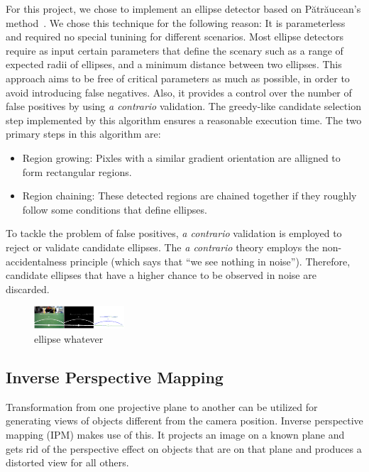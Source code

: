 \documentclass[	DIV=calc,%
							paper=a4,%
							fontsize=9pt,%
							twocolumn]{scrartcl}	 					%
\begin{document}
For this project, we chose to implement an ellipse detector based on P{\u{a}}tr{\u{a}}ucean's method~\cite{ED}. We chose this technique for the following reason: It is parameterless and required no special tunining for different scenarios. Most ellipse detectors require as input certain parameters that define the scenary such as a range of expected radii of ellipses, and a minimum distance between two ellipses. This approach aims to be free of critical parameters as much as possible, in order to avoid introducing false negatives. Also, it provides a control over the number of false positives by using \emph{a contrario} validation. The greedy-like candidate selection step implemented by this algorithm ensures a reasonable execution time. The two primary steps in this algorithm are: 

\begin{itemize}
\item Region growing: Pixles with a similar gradient orientation are alligned to form rectangular regions.
\item Region chaining: These detected regions are chained together if they roughly follow some conditions that define ellipses.
\end{itemize}

To tackle the problem of false positives, \emph{a contrario} validation is employed to reject or validate candidate ellipses. The \emph{a contrario} theory employs the non-accidentalness principle (which says that ``we see nothing in noise''). Therefore, candidate ellipses that have a higher chance to be observed in noise are discarded. %

\begin{figure}[t!]
\caption{ellipse whatever}
\label{ellipse1}
\centering    
\includegraphics[width=0.3\textwidth]{figures/ellipseDetection.png}
\end{figure}

\subsection{Inverse Perspective Mapping}
Transformation from one projective plane to another can be utilized for generating views of objects different from the camera position. Inverse perspective mapping (IPM) makes use of this. It projects an image on a known plane and gets rid of the perspective effect on objects that are on that plane and produces a distorted view for all others\cite{IPM2}.
\end{document}
